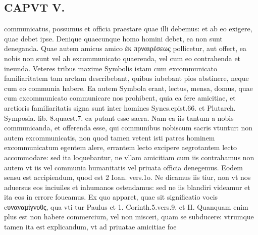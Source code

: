 \documentclass{article}
\begin{document}
\begin{pages}
\section*{CAPVT  V. }
\marginpar{[ p.405 ]}\pstart communicatus, possumus et officia praestare quae illi debemus: et ab eo exigere, quae debet ipse. Denique quaecunque homo homini debet, ea non sunt deneganda. Quae autem amicus amico ἐκ πρναιρέσεως pollicetur, aut offert, ea nobis non sunt vel ab excommunicato quaerenda, vel cum eo contrahenda et ineunda. Veteres tribus maxime Symbolis istam cum excommunicato familiaritatem tam arctam describebant, quibus iubebant pios abstinere, neque cum eo communia habere. Ea autem Symbola erant, lectus, mensa, domus, quae cum excommunicato communicare nos prohibent, quia ea fere amicitiae, et arctioris familiaritatis signa sunt inter homines Synes.epist.66. et Plutarch. Symposia. lib.  8.quaest.7. ea putant esse sacra. Nam ea iis tantum a nobis communicanda, et offerenda esse, qui communibus nobiscum sacris vtuntur: non autem excommunicatis, non quod tamen vetent isti patres hominem excommunicatum egentem alere, errantem lecto excipere aegrotantem lecto accommodare: sed ita loquebantur, ne vllam amicitiam cum iis contrahamus non autem vt iis vel communia humanitatis vel priuata officia denegemus. Eodem sensu est accipiendum, quod est 2 Ioan. vers.1o. Ne dicamus iis tiur, non vt nos aduersus eos inciuiles et inhumanos ostendamus: sed ne iis blandiri videamur et ita eos in errore foueamus. Ex quo apparet, quae sit significatio vocis eυναναμίγνυθς, qua vti tur Paulus et 1. Corinth.5.vers.9. et II. Quanquam enim plus est non habere commercium, vel non misceri, quam se subducere: vtrumque tamen ita est explicandum, vt ad priuatae amicitiae foe\pend

\end{pages}
\end{document}
